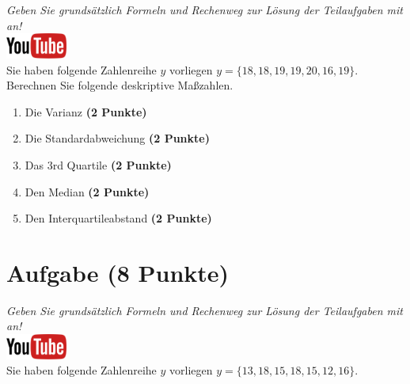 \documentclass[a4paper, 10pt]{scrartcl}\usepackage[]{graphicx}\usepackage[]{xcolor}
\begin{document}
\textit{Geben Sie grunds{\"a}tzlich Formeln und Rechenweg zur L{\"o}sung der
  Teilaufgaben mit an!} \\[1Ex]

\hfill\href{https://youtu.be/sBlSc_eJbnw}{\includegraphics[width =
  2cm]{img/youtube}}\\[1Ex]


Sie haben folgende Zahlenreihe $y$ vorliegen
$y = \{18, 18, 19, 19, 20, 16, 19\}$. Berechnen Sie folgende
deskriptive Ma{\ss}zahlen. 



\begin{enumerate}
\item Die Varianz \textbf{(2 Punkte)}
\item Die Standardabweichung \textbf{(2 Punkte)}
\item Das 3rd Quartile \textbf{(2 Punkte)}
\item Den Median \textbf{(2 Punkte)}
\item Den Interquartileabstand \textbf{(2 Punkte)}
\end{enumerate}
 
\clearpage

\section{Aufgabe \hfill (8 Punkte)}

\textit{Geben Sie grunds{\"a}tzlich Formeln und Rechenweg zur L{\"o}sung der
  Teilaufgaben mit an!} \\[1Ex]

\hfill\href{https://youtu.be/oMdtYbDInYE}{\includegraphics[width =
  2cm]{img/youtube}}\\[1Ex]

Sie haben folgende Zahlenreihe $y$ vorliegen
$y = \{13, 18, 15, 18, 15, 12, 16\}$.
\end{document}
